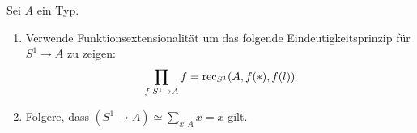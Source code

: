 \documentclass{uebung}
\begin{document}
\begin{exercise}
  Sei $A$ ein Typ.
  \begin{enumerate}
    \item Verwende Funktionsextensionalität um das folgende Eindeutigkeitsprinzip für $S^1 \to A$ zu zeigen:
      $$
      \prod_{f:S^1 \to A} f = \mathrm{rec}_{S^1}(A, f(\ast), f(l))
      $$
    \item Folgere, dass $(S^1\to A) \simeq \sum_{x:A} x=x$ gilt.
  \end{enumerate}
\end{exercise}
\end{document}
